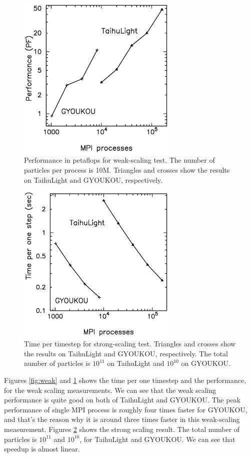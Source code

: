 \documentclass[conference]{IEEEtran}
\begin{document}
\begin{figure}
\includegraphics[width=3in]{weak_scaling_speed}
\caption{Performance in petaflops for weak-scaling test.  The number of
  particles per process is 10M. Triangles and crosses  show the
  results on TaihuLight and GYOUKOU, respectively.}
\label{fig:weakpf}
\end{figure}

\begin{figure}
\includegraphics[width=3in]{strong_scaling}
\caption{Time per timestep for strong-scaling test.  Triangles and crosses  show the
  results on TaihuLight and GYOUKOU, respectively. The total number of
  particles is $10^{11}$ on TaihuLight and $10^{10}$ on GYOUKOU.}
\label{fig:strong}
\end{figure}


Figures \ref{fig:weak} and \ref{fig:weakpf}  shows the time per one
timestep and the performance, for the
weak scaling measurements. We can see that the weak scaling
performance is quite good on both of TaihuLight and GYOUKOU. The peak
performance of single MPI process is roughly four times faster for
GYOUKOU, and that's the reason why it is around three times faster in
this weak-scaling measurement. 
Figures \ref{fig:strong} shows the strong scaling result. The total
number of particles is $10^{11}$ and  $10^{10}$, for TaihuLight and
GYOUKOU. We can see that speedup is almost linear.
\end{document}
